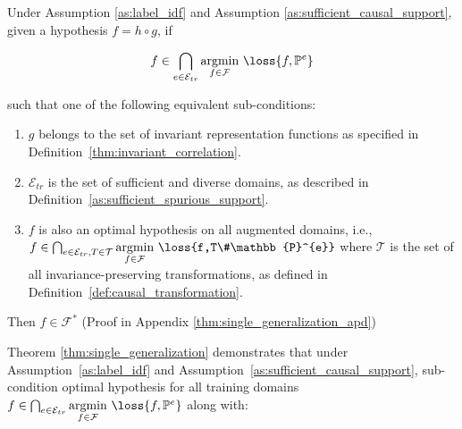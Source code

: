 \begin{theorem} Under Assumption \ref{as:label_idf} and Assumption \ref{as:sufficient_causal_support}, given a hypothesis $f=h\circ g$, if 

$$f\in \bigcap_{{e}\in \mathcal{E}_{tr}}\underset{f\in \mathcal{F}}{\text{argmin}} \ \loss{f,\mathbb{P}^{e}}$$

such that one of the following equivalent sub-conditions:
\begin{enumerate}
    \item $g$ belongs to the set of invariant representation functions as specified in Definition~\ref{thm:invariant_correlation}.
    
    \item $\mathcal{E}_{tr}$ is the set of sufficient and diverse domains, as described in Definition~\ref{as:sufficient_spurious_support}.
    
    \item $f$ is also an optimal hypothesis on all augmented domains, i.e., $f\in \bigcap_{{e}\in \mathcal{E}_{tr}, T\in \mathcal{T}}\underset{f\in \mathcal{F}}{\text{argmin}} \ \loss{f,T\#\mathbb{P}^{e}}$ where $\mathcal{T}$ is the set of all invariance-preserving transformations, as defined in Definition~\ref{def:causal_transformation}.
\end{enumerate}

Then $f\in \mathcal{F}^*$ (Proof in Appendix \ref{thm:single_generalization_apd})
\label{thm:single_generalization}
\end{theorem}




Theorem \ref{thm:single_generalization} demonstrates that under Assumption~\ref{as:label_idf} and Assumption~\ref{as:sufficient_causal_support},  
sub-condition optimal hypothesis for all training domains $f\in \bigcap_{{e}\in \mathcal{E}_{tr}}\underset{f\in \mathcal{F}}{\text{argmin}} \ \loss{f,\mathbb{P}^{e}}$ along with:

